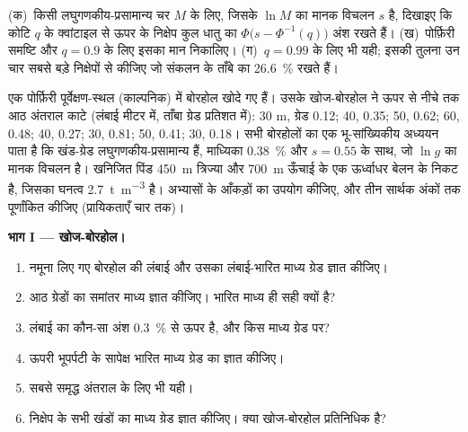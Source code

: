\begin{exercise}[$\star\star\star$]\label{exo:b2:ore-deposits:12}
(क)~किसी लघुगणकीय-प्रसामान्य चर $M$ के लिए, जिसके $\ln M$ का मानक विचलन $s$ है, दिखाइए कि कोटि $q$ के
क्वांटाइल से ऊपर के निक्षेप कुल धातु का $\Phi\bigl(s - \Phi^{-1}(q)\bigr)$ अंश रखते हैं।
(ख)~पोर्फ़िरी समष्टि और $q = 0.9$ के लिए इसका मान निकालिए। (ग)~$q = 0.99$ के लिए भी यही; इसकी तुलना
उन चार सबसे बड़े निक्षेपों से कीजिए जो संकलन के ताँबे का \qty{26.6}{\percent} रखते हैं।
\end{exercise}

\begin{problem}[{सप्ताहांत समस्या --- एक पोर्फ़िरी पूर्वेक्षण-स्थल}]\label{pb:b2:ore-deposits:1}
एक पोर्फ़िरी पूर्वेक्षण-स्थल (काल्पनिक) में बोरहोल खोदे गए हैं। उसके खोज-बोरहोल ने ऊपर से नीचे तक आठ
अंतराल काटे (लंबाई मीटर में, ताँबा ग्रेड प्रतिशत में): 30 m, ग्रेड 0.12; 40, 0.35; 50, 0.62; 60,
0.48; 40, 0.27; 30, 0.81; 50, 0.41; 30, 0.18। सभी बोरहोलों का एक भू-सांख्यिकीय अध्ययन पाता है कि
खंड-ग्रेड लघुगणकीय-प्रसामान्य हैं, माध्यिका \qty{0.38}{\percent} और $s = 0.55$ के साथ, जो $\ln g$ का मानक
विचलन है। खनिजित पिंड \qty{450}{m} त्रिज्या और \qty{700}{m} ऊँचाई के एक ऊर्ध्वाधर बेलन के निकट है, जिसका
घनत्व \qty{2.7}{t.m^{-3}} है। अभ्यासों के आँकड़ों का उपयोग कीजिए, और तीन सार्थक अंकों तक पूर्णांकित कीजिए
(प्रायिकताएँ चार तक)।

\noindent\textbf{भाग I --- खोज-बोरहोल।}
\begin{enumerate}
  \item नमूना लिए गए बोरहोल की लंबाई और उसका लंबाई-भारित माध्य ग्रेड ज्ञात कीजिए।
  \item आठ ग्रेडों का समांतर माध्य ज्ञात कीजिए। भारित माध्य ही सही क्यों है?
  \item लंबाई का कौन-सा अंश \qty{0.3}{\percent} से ऊपर है, और किस माध्य ग्रेड पर?
  \item ऊपरी भूपर्पटी के सापेक्ष भारित माध्य ग्रेड का  ज्ञात कीजिए।
  \item सबसे समृद्ध अंतराल के लिए भी यही।
  \item निक्षेप के सभी खंडों का माध्य ग्रेड ज्ञात कीजिए। क्या खोज-बोरहोल प्रतिनिधिक है?
\end{enumerate}


\end{problem}
